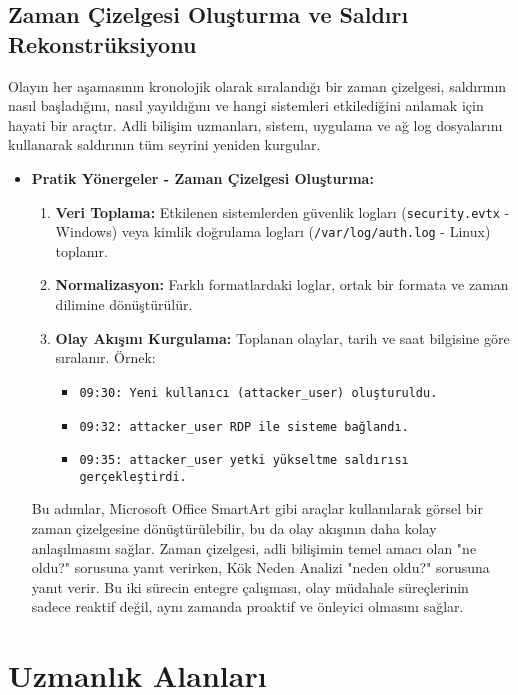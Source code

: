 \subsection{Zaman Çizelgesi Oluşturma ve Saldırı Rekonstrüksiyonu}

Olayın her aşamasının kronolojik olarak sıralandığı bir zaman çizelgesi, saldırının nasıl başladığını, nasıl yayıldığını ve hangi sistemleri etkilediğini anlamak için hayati bir araçtır. Adli bilişim uzmanları, sistem, uygulama ve ağ log dosyalarını kullanarak saldırının tüm seyrini yeniden kurgular.

\begin{itemize}
    \item \textbf{Pratik Yönergeler - Zaman Çizelgesi Oluşturma:}
    \begin{enumerate}
        \item \textbf{Veri Toplama:} Etkilenen sistemlerden güvenlik logları (\texttt{security.evtx} - Windows) veya kimlik doğrulama logları (\texttt{/var/log/auth.log} - Linux) toplanır.
        \item \textbf{Normalizasyon:} Farklı formatlardaki loglar, ortak bir formata ve zaman dilimine dönüştürülür.
        \item \textbf{Olay Akışını Kurgulama:} Toplanan olaylar, tarih ve saat bilgisine göre sıralanır. Örnek:
        \begin{itemize}
            \item \texttt{09:30: Yeni kullanıcı (attacker\_user) oluşturuldu.}
            \item \texttt{09:32: attacker\_user RDP ile sisteme bağlandı.}
            \item \texttt{09:35: attacker\_user yetki yükseltme saldırısı gerçekleştirdi.}
        \end{itemize}
    \end{enumerate}
    Bu adımlar, Microsoft Office SmartArt gibi araçlar kullanılarak görsel bir zaman çizelgesine dönüştürülebilir, bu da olay akışının daha kolay anlaşılmasını sağlar. Zaman çizelgesi, adli bilişimin temel amacı olan "ne oldu?" sorusuna yanıt verirken, Kök Neden Analizi "neden oldu?" sorusuna yanıt verir. Bu iki sürecin entegre çalışması, olay müdahale süreçlerinin sadece reaktif değil, aynı zamanda proaktif ve önleyici olmasını sağlar.
\end{itemize}

\section{Uzmanlık Alanları}

